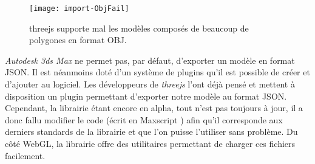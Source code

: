 \begin{figure}
	\centering
	\texttt{[image: import-ObjFail]}
	\caption{threejs supporte mal les modèles composés de beaucoup de polygones en format OBJ.}
	\label{fig:import-objfail}
\end{figure}

\textit{Autodesk 3ds Max} ne permet pas, par défaut, d'exporter un modèle en format JSON. Il est néanmoins doté d'un système de plugins qu'il est possible de créer et d'ajouter au logiciel. Les développeurs de \textit{threejs} l'ont déjà pensé et mettent à disposition un plugin permettant d'exporter notre modèle au format JSON. Cependant, la librairie étant encore en alpha, tout n'est pas toujours à jour, il a donc fallu modifier le code (écrit en Maxscript \cite{autodesk-maxscript}) afin qu'il corresponde aux derniers standards de la librairie et que l'on puisse l'utiliser sans problème. Du côté WebGL, la librairie offre des utilitaires permettant de charger ces fichiers facilement.